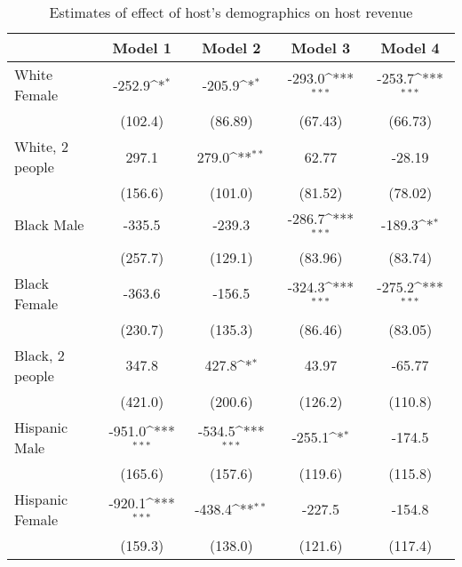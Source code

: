 {
\def\sym#1{\ifmmode^{#1}\else\(^{#1}\)\fi}
\begin{longtable}{l*{4}{c}}
\caption{Estimates of effect of host's demographics on host revenue}\\
\hline\hline\endfirsthead\hline\endhead\hline\endfoot\endlastfoot
                    &\multicolumn{1}{c}{Model 1}&\multicolumn{1}{c}{Model 2}&\multicolumn{1}{c}{Model 3}&\multicolumn{1}{c}{Model 4}\\
\hline

White Female        &      -252.9\sym{*}  &      -205.9\sym{*}  &      -293.0\sym{***}&      -253.7\sym{***}\\
                    &     (102.4)         &     (86.89)         &     (67.43)         &     (66.73)         \\
[1em]
White, 2 people    &       297.1         &       279.0\sym{**} &       62.77         &      -28.19         \\
                    &     (156.6)         &     (101.0)         &     (81.52)         &     (78.02)         \\
[1em]
Black Male          &      -335.5         &      -239.3         &      -286.7\sym{***}&      -189.3\sym{*}  \\
                    &     (257.7)         &     (129.1)         &     (83.96)         &     (83.74)         \\
[1em]
Black Female        &      -363.6         &      -156.5         &      -324.3\sym{***}&      -275.2\sym{***}\\
                    &     (230.7)         &     (135.3)         &     (86.46)         &     (83.05)         \\
[1em]
Black, 2 people    &       347.8         &       427.8\sym{*}  &       43.97         &      -65.77         \\
                    &     (421.0)         &     (200.6)         &     (126.2)         &     (110.8)         \\
[1em]
Hispanic Male       &      -951.0\sym{***}&      -534.5\sym{***}&      -255.1\sym{*}  &      -174.5         \\
                    &     (165.6)         &     (157.6)         &     (119.6)         &     (115.8)         \\
[1em]
Hispanic Female     &      -920.1\sym{***}&      -438.4\sym{**} &      -227.5         &      -154.8         \\
                    &     (159.3)         &     (138.0)         &     (121.6)         &     (117.4)         \\

\end{longtable}}
